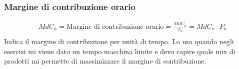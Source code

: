 \documentclass[a4paper,10pt]{article}
\begin{document}
\subsubsection{Margine di contribuzione orario}
\begin{align*}
     & MdC_h = \text{Margine di contribuzione orario} = \displaystyle\frac{MdC_{u}}{T_{u}} = MdC_u \cdot P_h \\
\end{align*}
Indica il margine di contribuzione per unità di tempo.
Lo uso quando negli esercizi mi viene dato un tempo macchina limite e devo capire quale mix di prodotti mi permette di massimizzare il margine di contribuzione.
\begin{table}[H]
    \setlength{\extrarowheight}{12pt}
\end{table}
\end{document}
